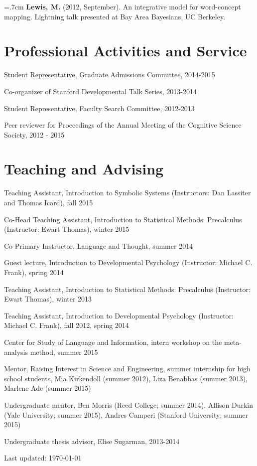 \documentclass[letterpaper]{article}
\def\footerlink{}
\renewenvironment{itemize}{
  \begin{list}{}{
    \setlength{\leftmargin}{1.5em}
  }
}{
  \end{list}
}
\begin{document}
 
 \hangindent=.7cm {\bf Lewis, M.} (2012, September). An integrative model for word-concept mapping. Lightning talk presented at Bay Area Bayesians, UC Berkeley.
 
 


\section*{Professional Activities and Service}
\begin{itemize}
\item Student Representative, Graduate Admissions Committee, 2014-2015
\item  Co-organizer of Stanford Developmental Talk Series, 2013-2014
\item Student Representative, Faculty Search Committee, 2012-2013
\item Peer reviewer for Proceedings of the Annual Meeting of the Cognitive Science Society, 2012 -  2015
\end{itemize}

\section*{Teaching and Advising}
\begin{itemize}
\item Teaching Assistant, Introduction to Symbolic Systems (Instructors: Dan Lassiter and Thomas Icard), fall 2015
\item Co-Head Teaching Assistant, Introduction to Statistical Methods: Precalculus	 (Instructor: Ewart Thomas), winter 2015
\item Co-Primary Instructor, Language and Thought, summer 2014
\item Guest lecture, Introduction to Developmental Psychology (Instructor: Michael C. Frank), spring 2014
\item Teaching Assistant, Introduction to Statistical Methods: Precalculus	 (Instructor: Ewart Thomas), winter 2013
\item Teaching Assistant, Introduction to Developmental Psychology (Instructor: Michael C. Frank), fall 2012, spring 2014
\item Center for Study of Language and Information, intern workshop on the meta-analysis method, summer 2015
\item Mentor, Raising Interest in Science and Engineering, summer internship for high school students, Mia Kirkendoll (summer 2012),  Liza Benabbas (summer 2013), Marlene Ade (summer 2015)
\item Undergraduate mentor,  Ben Morris (Reed College; summer 2014), Allison Durkin (Yale University; summer 2015), Andres Camperi (Stanford University; summer 2015)
\item Undergraduate thesis advisor, Elise Sugarman,  2013-2014
\end{itemize}


\bigskip

\begin{center}
  \begin{footnotesize}
    Last updated: \today \\
    \href{\footerlink}{\texttt{\footerlink}}
  \end{footnotesize}
\end{center}
\end{document}
